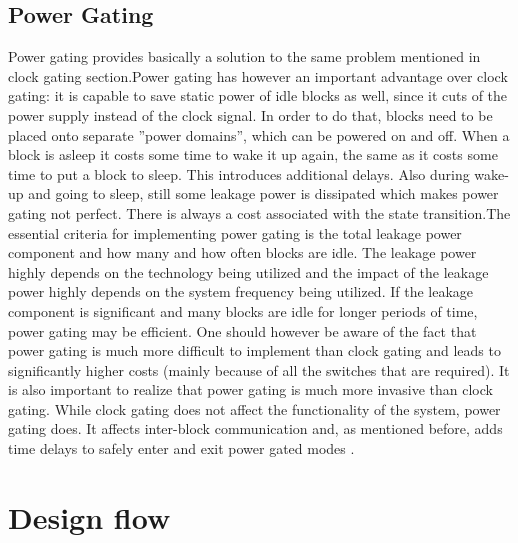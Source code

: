  \subsection{Power Gating}
 Power gating provides basically a solution to the same problem mentioned in clock gating section.Power gating has however an important advantage over clock gating: it is capable 
 to save static power of idle blocks as well, since it cuts of the power supply instead of 
 the clock signal. In order to do that, blocks need to be placed onto separate ”power 
 domains”, which can be powered on and off. 
 When a block is asleep it costs some time to wake it up again, the same as it costs 
 some time to put a block to sleep. This introduces additional delays. Also during 
 wake-up and going to sleep, still some leakage power is dissipated which makes power 
 gating not perfect. There is always a cost associated with the state transition.The essential criteria for implementing power gating is the total leakage power component and how many and how often blocks are idle. The leakage power highly depends on the technology being utilized and the impact of the leakage 
 power highly depends on the system frequency being utilized. If the leakage component 
 is significant and many blocks are idle for longer periods of time, power gating may 
 be efficient. One should however be aware of the fact that power gating is much more 
 difficult to implement than clock gating and leads to significantly higher costs (mainly 
 because of all the switches that are required). It is also important to realize that power 
 gating is much more invasive than clock gating. While clock gating does not affect the 
 functionality of the system, power gating does. It affects inter-block communication and, 
 as mentioned before, adds time delays to safely enter and exit power gated modes \cite{LowPowerMethod}. 
 
 \section{Design flow}
 
